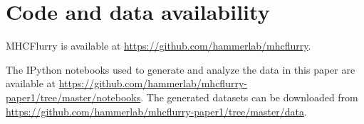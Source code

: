 \section{Code and data availability}
MHCFlurry is available at \href{https://github.com/hammerlab/mhcflurry}{https://github.com/hammerlab/mhcflurry}.

The IPython\cite{Perez_2007} notebooks used to generate and analyze the data in this paper are available at \href{https://github.com/hammerlab/mhcflurry-paper1/tree/master/notebooks}{https://github.com/hammerlab/mhcflurry-paper1/tree/master/notebooks}. The generated datasets can be downloaded from \href{https://github.com/hammerlab/mhcflurry-paper1/tree/master/data}{https://github.com/hammerlab/mhcflurry-paper1/tree/master/data}.

